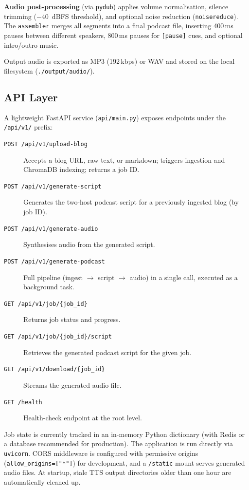 \documentclass[sigconf,natbib=false]{acmart}   %
\begin{document}
\textbf{Audio post-processing} (via \texttt{pydub}) applies volume normalisation, silence trimming ($-40$~dBFS threshold), and optional noise reduction (\texttt{noisereduce}).  The \texttt{assembler} merges all segments into a final podcast file, inserting 400\,ms pauses between different speakers, 800\,ms pauses for \texttt{[pause]} cues, and optional intro/outro music.

Output audio is exported as MP3 (192\,kbps) or WAV and stored on the local filesystem (\texttt{./output/audio/}).

\subsection{API Layer}
A lightweight FastAPI service (\texttt{api/main.py}) exposes endpoints under the \texttt{/api/v1/} prefix:

\begin{description}
  \item[\texttt{POST /api/v1/upload-blog}] Accepts a blog URL, raw text, or markdown; triggers ingestion and ChromaDB indexing; returns a job ID.
  \item[\texttt{POST /api/v1/generate-script}] Generates the two-host podcast script for a previously ingested blog (by job ID).
  \item[\texttt{POST /api/v1/generate-audio}] Synthesises audio from the generated script.
  \item[\texttt{POST /api/v1/generate-podcast}] Full pipeline (ingest $\to$ script $\to$ audio) in a single call, executed as a background task.
  \item[\texttt{GET /api/v1/job/\{job\_id\}}] Returns job status and progress.
  \item[\texttt{GET /api/v1/job/\{job\_id\}/script}] Retrieves the generated podcast script for the given job.
  \item[\texttt{GET /api/v1/download/\{job\_id\}}] Streams the generated audio file.
  \item[\texttt{GET /health}] Health-check endpoint at the root level.
\end{description}

Job state is currently tracked in an in-memory Python dictionary (with Redis or a database recommended for production).  The application is run directly via \texttt{uvicorn}.  CORS middleware is configured with permissive origins (\texttt{allow\_origins=["*"]}) for development, and a \texttt{/static} mount serves generated audio files.  At startup, stale TTS output directories older than one hour are automatically cleaned up.
\end{document}
